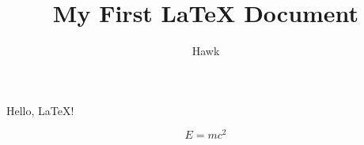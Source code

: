 \documentclass{article}
\title{My First LaTeX Document}
\author{Hawk}
\begin{document}
\maketitle

Hello, LaTeX!

\[
    E = mc^2
\]
\end{document}
